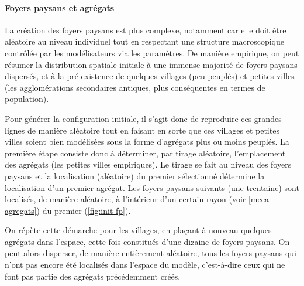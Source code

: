 \paragraph{Foyers paysans et agrégats}
La création des foyers paysans est plus complexe, notamment car elle doit être aléatoire au niveau individuel tout en respectant une structure macroscopique contrôlée par les modélisateurs via les paramètres.
De manière empirique, on peut résumer la distribution spatiale initiale à une immense majorité de foyers paysans dispersés, et à la pré-existence de quelques villages (peu peuplés) et petites villes (les agglomérations secondaires antiques, plus conséquentes en termes de population).

Pour générer la configuration initiale, il s'agit donc de reproduire ces grandes lignes de manière aléatoire tout en faisant en sorte que ces villages et petites villes soient bien modélisées sous la forme d'agrégats plus ou moins peuplés.
La première étape consiste donc à déterminer, par tirage aléatoire, l'emplacement des agrégats (les \og petites villes\fg{} empiriques).
Le tirage se fait au niveau des foyers paysans et la localisation (aléatoire) du premier sélectionné détermine la localisation d'un premier agrégat.
Les foyers paysans suivants (une trentaine) sont localisés, de manière aléatoire, à l'intérieur d'un certain rayon (voir \cref{meca-agregats}) du premier (\cref{fig:init-fp}).

On répète cette démarche pour les \og villages\fg{}, en plaçant à nouveau quelques agrégats dans l'espace, cette fois constitués d'une dizaine de foyers paysans.
On peut alors disperser, de manière entièrement aléatoire, tous les foyers paysans qui n'ont pas encore été localisés dans l'espace du modèle, c'est-à-dire ceux qui ne font pas partie des agrégats précédemment créés.

